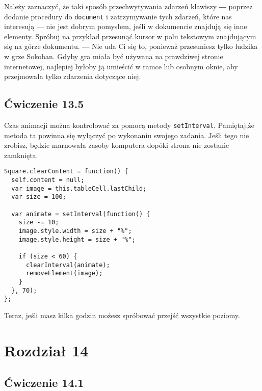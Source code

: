 Należy zaznaczyć, że taki sposób przechwytywania zdarzeń klawiszy ― poprzez dodanie procedury do \texttt{document} i zatrzymywanie tych zdarzeń, które nas interesują — nie jest dobrym pomysłem, jeśli w dokumencie znajdują się inne elementy. Spróbuj na przykład przesunąć kursor w polu tekstowym znajdującym się na górze dokumentu. ― Nie uda Ci się to, ponieważ przesuniesz tylko ludzika w grze Sokoban. Gdyby gra miała być używana na prawdziwej stronie internetowej, najlepiej byłoby ją umieścić w ramce lub osobnym oknie, aby przejmowała tylko zdarzenia dotyczące niej.

  
\subsection*{Ćwiczenie 13.5}
\label{sol:13.5}   
    
Czas animacji można kontrolować za pomocą metody \texttt{setInterval}. Pamiętaj,że metoda ta powinna się wyłączyć po wykonaniu swojego zadania. Jeśli tego nie zrobisz, będzie marnowała zasoby komputera dopóki strona nie zostanie zamknięta.

    
\begin{verbatim} 
Square.clearContent = function() {
  self.content = null;
  var image = this.tableCell.lastChild;
  var size = 100;

  var animate = setInterval(function() {
    size -= 10;
    image.style.width = size + "%";
    image.style.height = size + "%";

    if (size < 60) {
      clearInterval(animate);
      removeElement(image);
    }
  }, 70);
};
\end{verbatim}
    
Teraz, jeśli masz kilka godzin możesz spróbować przejść wszystkie poziomy.


\section*{Rozdział 14}
\label{sol:14}

\subsection*{Ćwiczenie 14.1}
\label{sol:14.1}
    
